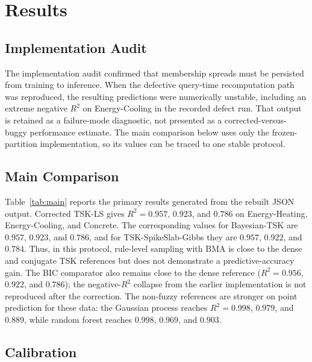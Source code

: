\documentclass[1p,times]{elsarticle}
\begin{document}
\section{Results}
\label{sec:results}

\subsection{Implementation Audit}
\label{sec:repro}

The implementation audit confirmed that membership spreads must be persisted from training to inference.
When the defective query-time recomputation path was reproduced, the resulting predictions were numerically unstable, including an extreme negative $R^2$ on Energy-Cooling in the recorded defect run.
That output is retained as a failure-mode diagnostic, not presented as a corrected-versus-buggy performance estimate.
The main comparison below uses only the frozen-partition implementation, so its values can be traced to one stable protocol.

\subsection{Main Comparison}
\label{sec:main}

Table~\ref{tab:main} reports the primary results generated from the rebuilt JSON output.
Corrected TSK-LS gives $R^2=0.957$, $0.923$, and $0.786$ on Energy-Heating, Energy-Cooling, and Concrete.
The corresponding values for Bayesian-TSK are $0.957$, $0.923$, and $0.786$, and for TSK-SpikeSlab-Gibbs they are $0.957$, $0.922$, and $0.784$.
Thus, in this protocol, rule-level sampling with BMA is close to the dense and conjugate TSK references but does not demonstrate a predictive-accuracy gain.
The BIC comparator also remains close to the dense reference ($R^2=0.956$, $0.922$, and $0.786$); the negative-$R^2$ collapse from the earlier implementation is not reproduced after the correction.
The non-fuzzy references are stronger on point prediction for these data: the Gaussian process reaches $R^2=0.998$, $0.979$, and $0.889$, while random forest reaches $0.998$, $0.969$, and $0.903$.



\FloatBarrier

\subsection{Calibration}
\label{sec:calibration}
\end{document}

